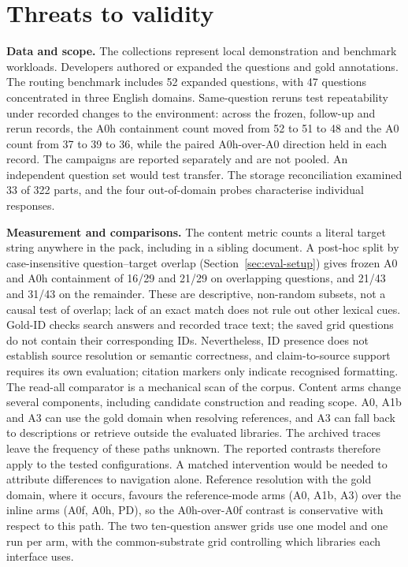 \section{Threats to validity}
\label{sec:threats}

\noindent\textbf{Data and scope.} The collections represent local
demonstration and benchmark workloads. Developers authored or expanded the
questions and gold annotations. The routing benchmark includes 52 expanded
questions, with 47 questions concentrated in three English domains.
Same-question reruns test repeatability under recorded changes to the
environment: across the frozen, follow-up and rerun records, the A0h
containment count moved from 52 to 51 to 48 and the A0 count from 37 to
39 to 36, while the paired A0h-over-A0 direction held in each record.
The campaigns are reported separately and are not pooled. An independent
question set would test transfer. The storage
reconciliation examined 33 of 322 parts, and the four out-of-domain probes
characterise individual responses.

\noindent\textbf{Measurement and comparisons.} The content metric counts a
literal target string anywhere in the pack, including in a sibling
document. A post-hoc split by case-insensitive question--target overlap
(Section~\ref{sec:eval-setup}) gives frozen A0 and A0h containment of
16/29 and 21/29 on overlapping questions, and 21/43 and 31/43 on the
remainder. These are descriptive, non-random subsets, not a causal test of
overlap; lack of an exact match does not rule out other lexical cues.
Gold-ID checks search answers and recorded trace text; the saved grid
questions do not contain their corresponding IDs. Nevertheless, ID presence
does not establish source resolution or semantic correctness, and
claim-to-source support requires its own evaluation; citation markers only
indicate recognised formatting. The read-all comparator is a mechanical
scan of the corpus. Content arms change several components, including candidate
construction and reading scope. A0, A1b and A3 can use the gold domain when
resolving references, and A3 can fall back to descriptions or retrieve
outside the evaluated libraries. The archived traces leave the frequency of
these paths unknown. The reported contrasts therefore apply to the tested
configurations. A matched intervention would be needed to attribute
differences to navigation alone. Reference resolution with the gold
domain, where it occurs, favours the reference-mode arms (A0, A1b, A3)
over the inline arms (A0f, A0h, PD), so the A0h-over-A0f contrast is
conservative with respect to this path. The two ten-question answer grids use one
model and one run per arm, with the common-substrate grid controlling which
libraries each interface uses.

